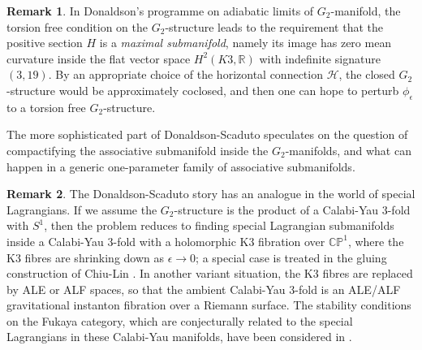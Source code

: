 \documentclass{article}
\theoremstyle{definition}
\newtheorem{rmk}{Remark}
\newcommand{\R}{\mathbb{R}}
\newcommand{\C}{\mathbb{C}}
\begin{document}
		
		
		
		
		
		

		
		
		\begin{rmk}
			In Donaldson's programme on adiabatic limits of $G_2$-manifold, the torsion free condition on the $G_2$-structure leads to the requirement that the positive section $H$ is a \emph{maximal submanifold}, namely its image  has zero mean curvature inside the flat vector space $H^2(K3, \R)$ with indefinite signature $(3, 19)$. By an appropriate choice of the horizontal connection $\mathcal{H}$, the closed $G_2$-structure would be approximately coclosed, and then one can hope to perturb $\phi_\epsilon$ to a torsion free $G_2$-structure.			
			
			
			
			The more sophisticated part of Donaldson-Scaduto \cite{DonaldsonScaduto} speculates on the question of compactifying the associative submanifold inside the $G_2$-manifolds, and what can happen in a generic one-parameter family of associative submanifolds. %
			
			
			
			
			
		\end{rmk}
		
		
		
		
		
		\begin{rmk}
			The Donaldson-Scaduto story has an analogue in the world of special Lagrangians. If we assume the $G_2$-structure is the product of a Calabi-Yau 3-fold with $S^1$, then the problem reduces to finding special Lagrangian submanifolds inside a Calabi-Yau 3-fold with a holomorphic K3 fibration over $\mathbb{CP}^1$, where the K3 fibres are shrinking down as $\epsilon\to 0$;  a special case is treated in the gluing construction of Chiu-Lin \cite{ChiuLin}. In another variant situation, the K3 fibres are replaced by ALE or ALF spaces, so that the ambient Calabi-Yau 3-fold is an ALE/ALF gravitational instanton fibration over a Riemann surface. The stability conditions on the Fukaya category, which are conjecturally related to the special Lagrangians in these Calabi-Yau manifolds, have been considered in \cite{Smith, BridgelandSmith}.
		\end{rmk}
		
\end{document}

